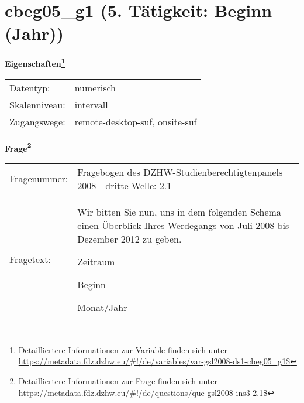 
    \setcounter{footnote}{0}

    \vspace*{-1.8cm}
	\section{cbeg05\_g1 (5. Tätigkeit: Beginn (Jahr))}
	\label{section:cbeg05_g1}



    \vspace*{0.5cm}
    \noindent\textbf{Eigenschaften\footnote{Detailliertere Informationen zur Variable finden sich unter
		\url{https://metadata.fdz.dzhw.eu/\#!/de/variables/var-gsl2008-ds1-cbeg05_g1$}}}\\
	\begin{tabularx}{\hsize}{@{}lX}
	Datentyp: & numerisch \\
	Skalenniveau: & intervall \\
	Zugangswege: &
	  remote-desktop-suf, 
	  onsite-suf
 \\
    \end{tabularx}



				\vspace*{0.5cm}
                \noindent\textbf{Frage\footnote{Detailliertere Informationen zur Frage finden sich unter
		              \url{https://metadata.fdz.dzhw.eu/\#!/de/questions/que-gsl2008-ins3-2.1$}}}\\
				\begin{tabularx}{\hsize}{@{}lX}
					Fragenummer: &
					  Fragebogen des DZHW-Studienberechtigtenpanels 2008 - dritte Welle:
					  2.1
 \\
					Fragetext: & Wir bitten Sie nun, uns in dem folgenden Schema einen Überblick Ihres Werdegangs von Juli 2008 bis Dezember 2012 zu geben.\par  Zeitraum\par  Beginn\par  Monat/Jahr \\
				\end{tabularx}






